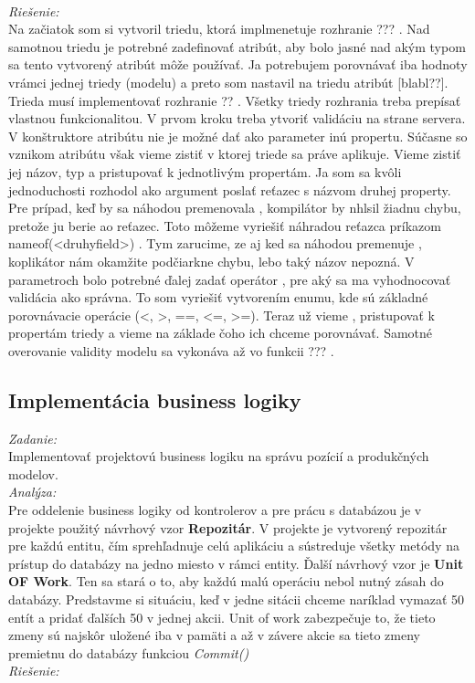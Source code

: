 \documentclass[11pt, oneside]{report}
\begin{document}
\\\textit{Riešenie:}\\
Na začiatok som si vytvoril triedu, ktorá implmenetuje rozhranie ??? . Nad samotnou triedu je potrebné zadefinovať atribút, aby bolo jasné nad akým typom sa tento vytvorený atribút môže používať. Ja  potrebujem porovnávať iba hodnoty vrámci jednej triedy (modelu)  a preto  som nastavil na triedu atribút [blabl??]. Trieda musí implementovať rozhranie ?? . Všetky triedy rozhrania treba prepísať vlastnou funkcionalitou.  V prvom kroku  treba ytvoriť validáciu na strane servera. V konštruktore atribútu nie je možné dať ako parameter inú propertu. Súčasne so vznikom atribútu však vieme zistiť v ktorej triede sa práve aplikuje. Vieme zistiť jej názov, typ a pristupovať  k jednotlivým propertám. Ja som sa kvôli jednoduchosti rozhodol ako argument poslať reťazec s názvom druhej property.  Pre prípad, keď by sa náhodou premenovala ,  kompilátor by nhlsil žiadnu chybu, pretože ju berie ao reťazec. Toto môžeme vyriešiť náhradou reťazca príkazom  nameof(<druhyfield>) . Tym zarucime, ze aj ked sa  náhodou premenuje , koplikátor nám okamžite podčiarkne chybu, lebo taký názov nepozná. V parametroch bolo potrebné ďalej zadať operátor , pre aký sa ma vyhodnocovať validácia ako správna. To som vyriešiť vytvorením enumu, kde sú základné porovnávacie operácie (<, >, ==, <=, >=). Teraz už vieme , pristupovať k propertám triedy a vieme na základe čoho ich chceme porovnávať. Samotné overovanie  validity modelu sa vykonáva až vo funkcii ??? .  
\subsection{Implementácia business logiky}
\textit{Zadanie:}\\
Implementovať projektovú business logiku na správu pozícií a produkčných modelov.
\\\textit{Analýza:}\\
Pre oddelenie business logiky od kontrolerov a pre prácu s databázou je v projekte použitý návrhový vzor \textbf{Repozitár}. V projekte je vytvorený repozitár pre každú entitu, čím  sprehľadnuje celú aplikáciu a sústreduje všetky metódy na prístup do databázy na jedno miesto v rámci entity. Ďalší návrhový vzor je \textbf{Unit OF Work}. Ten sa stará o to, aby každú malú operáciu nebol nutný zásah do databázy. Predstavme si situáciu, keď v jedne sitácii chceme  naríklad  vymazať 50 entít a pridať ďalších 50 v jednej akcii. Unit of work zabezpečuje to, že tieto zmeny sú najskôr uložené  iba v pamäti a až v závere akcie sa tieto zmeny premietnu do databázy funkciou \textit{Commit()}
\\\textit{Riešenie:}\\
\end{document}
